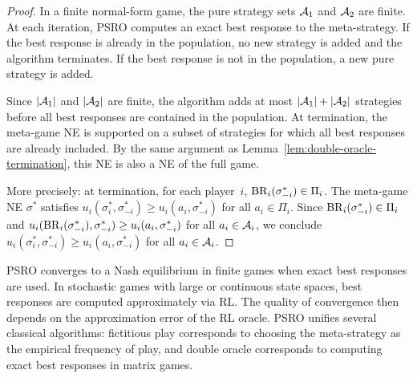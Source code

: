 \documentclass[11pt,a4paper]{article}
\begin{document}
\begin{proof}
In a finite normal-form game, the pure strategy sets $\mathcal{A}_1$ and
$\mathcal{A}_2$ are finite.  At each iteration, PSRO computes an exact
best response to the meta-strategy.  If the best response is already in
the population, no new strategy is added and the algorithm terminates.
If the best response is not in the population, a new pure strategy is
added.

Since $|\mathcal{A}_1|$ and $|\mathcal{A}_2|$ are finite, the algorithm adds
at most $|\mathcal{A}_1| + |\mathcal{A}_2|$ strategies before all best
responses are contained in the population.  At termination, the
meta-game NE is supported on a subset of strategies for which all best
responses are already included.  By the same argument as
Lemma~\ref{lem:double-oracle-termination}, this NE is also a NE of the
full game.

More precisely: at termination, for each player~$i$,
$\mathrm{BR}_i(\sigma_{-i}^*) \in \Pi_i$.  The meta-game NE $\sigma^*$
satisfies $u_i(\sigma_i^*, \sigma_{-i}^*) \ge u_i(a_i, \sigma_{-i}^*)$
for all $a_i \in \Pi_i$.  Since $\mathrm{BR}_i(\sigma_{-i}^*) \in \Pi_i$ and
$u_i(\mathrm{BR}_i(\sigma_{-i}^*), \sigma_{-i}^*) \ge u_i(a_i, \sigma_{-i}^*)$
for all $a_i \in \mathcal{A}_i$, we conclude
$u_i(\sigma_i^*, \sigma_{-i}^*) \ge u_i(a_i, \sigma_{-i}^*)$ for all
$a_i \in \mathcal{A}_i$.
\end{proof}

\begin{keyresult}[title={PSRO Convergence}]
PSRO converges to a Nash equilibrium in finite games when exact best
responses are used.  In stochastic games with large or continuous state
spaces, best responses are computed approximately via RL.  The quality
of convergence then depends on the approximation error of the RL oracle.
PSRO unifies several classical algorithms: fictitious play corresponds
to choosing the meta-strategy as the empirical frequency of play, and
double oracle corresponds to computing exact best responses in matrix
games.
\end{keyresult}
\end{document}
